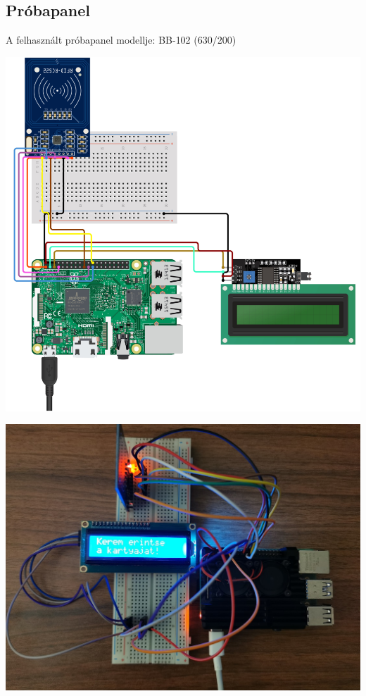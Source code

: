 \documentclass[11pt, a4paper]{article}
\begin{document}
		\subsection{Próbapanel}
			\begin{flushleft}
				\justifying
				A felhasznált próbapanel modellje: BB-102 (630/200)
			\end{flushleft}
			\begin{minipage}{\linewidth}
				\centering
				\includegraphics[width=1.0\linewidth]{img/breadboard_diagram}
				\label{fig:1breadboarddiagram}
			\end{minipage}
			\begin{minipage}{\linewidth}
				\centering
				\includegraphics[width=0.7\linewidth]{img/3_futas}
				\label{fig:3futas}
				
				
			\end{minipage}
			
\end{document}
